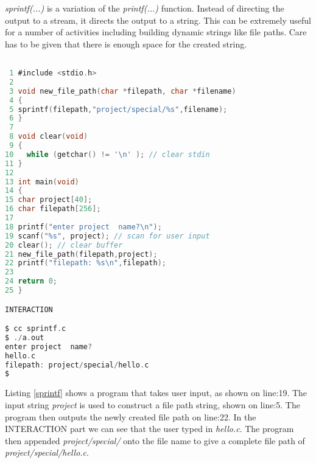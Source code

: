 
\textit{sprintf(...)} is a variation of the \textit{printf(...)} function. Instead of directing the output to a stream, it directs the output to a string. This can be extremely useful for a number of activities including building dynamic strings like file paths. Care has to be given that there is enough space for the created string.

\begin{lstlisting}[language=C,showstringspaces=false, caption={File: sprintf.c},captionpos=b,label=sprintf]

 1 #include <stdio.h>
 2 
 3 void new_file_path(char *filepath, char *filename)
 4 {
 5 sprintf(filepath,"project/special/%s",filename);
 6 }
 7 
 8 void clear(void)
 9 {    
10   while (getchar() != '\n' ); // clear stdin
11 }
12 
13 int main(void)
14 {
15 char project[40];
16 char filepath[256];
17 
18 printf("enter project  name?\n");
19 scanf("%s", project); // scan for user input
20 clear(); // clear buffer
21 new_file_path(filepath,project);
22 printf("filepath: %s\n",filepath);
23 
24 return 0;
25 }

INTERACTION

$ cc sprintf.c
$ ./a.out
enter project  name?
hello.c
filepath: project/special/hello.c
$

\end{lstlisting}

Listing \ref{sprintf} shows a program that takes user input, as shown on line:19. The input string \textit{project} is used to construct a file path string, shown on line:5. The program then outputs the newly created file path on line:22. In the INTERACTION part we can see that the user typed in \textit{hello.c}. The program then appended \textit{project/special/} onto the file name to give a complete file path of \textit{project/special/hello.c}.



